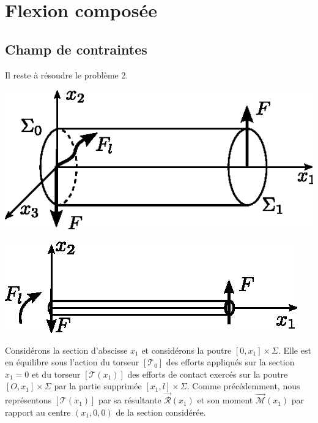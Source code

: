\section{Flexion composée} \label{sec:Ch07-3}
\subsection{Champ de contraintes} \label{ssec:Ch07-3.1}
Il reste à résoudre le problème 2.
\begin{multicols}{2}
    \begin{center}
        \includegraphics{../images/T1_Ch07-18a}
    \end{center}
    \columnbreak
    \begin{center}
        \includegraphics{../images/T1_Ch07-18b}
    \end{center}
\end{multicols}
Considérons la section d'abscisse $x_1$ et considérons la poutre $\left[ 0,x_1 \right] \times \Sigma$.
Elle est en équilibre sous l'action du torseur $[\mathcal{T}_0]$ des efforts appliqués sur la section $x_1 = 0$ et du torseur $[\mathcal{T}(x_1)]$ des efforts de contact exercés sur la poutre  $[O,x_1]\times \Sigma$ par la partie supprimée $[x_1,l]\times \Sigma$.
Comme précédemment, nous représentons $[\mathcal{T}(x_1)]$ par sa  résultante $\vec{\mathcal{R}} (x_1)$ et son moment $\vec{\mathcal{M}} (x_1)$ par rapport au centre $(x_1,0,0)$ de la section considérée.
